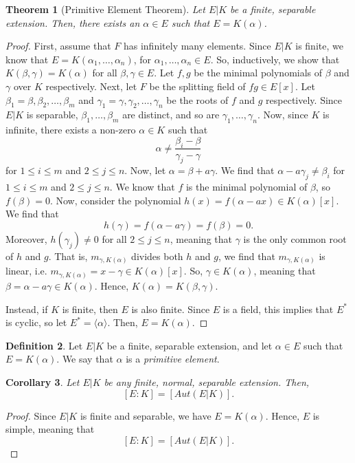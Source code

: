 \documentclass[a4paper, openany]{memoir}
\theoremstyle{definition}
\newtheorem{definition}{Definition}[section]
\theoremstyle{plain}
\newtheorem{theorem}[definition]{Theorem}
\newtheorem{corollary}[definition]{Corollary}
\begin{document}
    \begin{theorem}[Primitive Element Theorem]
        Let $E|K$ be a finite, separable extension. Then, there exists an $\alpha \in E$ such that $E = K(\alpha)$.
    \end{theorem}
    \begin{proof}
        First, assume that $F$ has infinitely many elements. Since $E|K$ is finite, we know that $E = K(\alpha_1, \dots, \alpha_n)$, for $\alpha_1, \dots, \alpha_n \in E$. So, inductively, we show that $K(\beta, \gamma) = K(\alpha)$ for all $\beta, \gamma \in E$. Let $f, g$ be the minimal polynomials of $\beta$ and $\gamma$ over $K$ respectively. Next, let $F$ be the splitting field of $fg \in E[x]$. Let $\beta_1 = \beta, \beta_2, \dots, \beta_m$ and $\gamma_1 = \gamma, \gamma_2, \dots, \gamma_n$ be the roots of $f$ and $g$ respectively. Since $E|K$ is separable, $\beta_1, \dots, \beta_m$ are distinct, and so are $\gamma_1, \dots, \gamma_n$. Now, since $K$ is infinite, there exists a non-zero $\alpha \in K$ such that
        \[\alpha \neq \frac{\beta_i - \beta}{\gamma_j - \gamma}\]
        for $1 \leq i \leq m$ and $2 \leq j \leq n$. Now, let $\alpha = \beta + a \gamma$. We find that $\alpha - a \gamma_j \neq \beta_i$ for $1 \leq i \leq m$ and $2 \leq j \leq n$. We know that $f$ is the minimal polynomial of $\beta$, so $f(\beta) = 0$. Now, consider the polynomial $h(x) = f(\alpha - ax) \in K(\alpha)[x]$. We find that
        \[h(\gamma) = f(\alpha - a \gamma) = f(\beta) = 0.\] 
        Moreover, $h(\gamma_j) \neq 0$ for all $2 \leq j \leq n$, meaning that $\gamma$ is the only common root of $h$ and $g$. That is, $m_{\gamma, K(\alpha)}$ divides both $h$ and $g$, we find that $m_{\gamma, K(\alpha)}$ is linear, i.e. $m_{\gamma, K(\alpha)} = x - \gamma \in K(\alpha)[x]$. So, $\gamma \in K(\alpha)$, meaning that $\beta = \alpha - a\gamma \in K(\alpha)$. Hence, $K(\alpha) = K(\beta, \gamma)$.

        Instead, if $K$ is finite, then $E$ is also finite. Since $E$ is a field, this implies that $E^*$ is cyclic, so let $E^* = \langle \alpha \rangle$. Then, $E = K(\alpha)$.
    \end{proof}

    \begin{definition}
        Let $E|K$ be a finite, separable extension, and let $\alpha \in E$ such that $E = K(\alpha)$. We say that $\alpha$ is a \emph{primitive element}.
    \end{definition}

    \begin{corollary}
        Let $E|K$ be any finite, normal, separable extension. Then,
        \[[E : K] = [Aut(E|K)].\]
    \end{corollary}
    \begin{proof}
        Since $E|K$ is finite and separable, we have $E = K(\alpha)$. Hence, $E$ is simple, meaning that 
        \[[E : K] = [Aut(E|K)].\]
    \end{proof}
\end{document}
